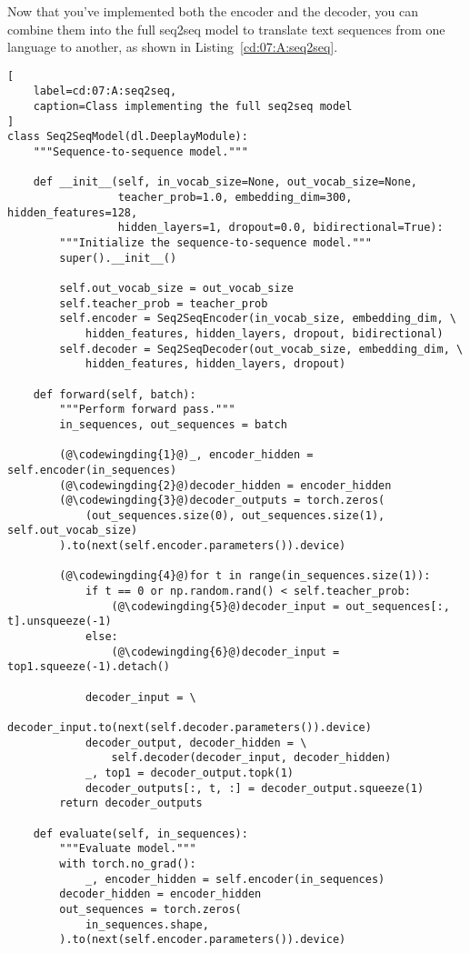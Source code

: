 Now that you've implemented both the encoder and the decoder, you can combine them into the full seq2seq model to translate text sequences from one language to another, as shown in Listing~\ref{cd:07:A:seq2seq}.
\begin{lstlisting}[
    label=cd:07:A:seq2seq,
    caption=Class implementing the full seq2seq model
]
class Seq2SeqModel(dl.DeeplayModule):
    """Sequence-to-sequence model."""

    def __init__(self, in_vocab_size=None, out_vocab_size=None,
                 teacher_prob=1.0, embedding_dim=300, hidden_features=128,
                 hidden_layers=1, dropout=0.0, bidirectional=True):
        """Initialize the sequence-to-sequence model."""
        super().__init__()
        
        self.out_vocab_size = out_vocab_size
        self.teacher_prob = teacher_prob
        self.encoder = Seq2SeqEncoder(in_vocab_size, embedding_dim, \
            hidden_features, hidden_layers, dropout, bidirectional)
        self.decoder = Seq2SeqDecoder(out_vocab_size, embedding_dim, \
            hidden_features, hidden_layers, dropout)

    def forward(self, batch):
        """Perform forward pass."""
        in_sequences, out_sequences = batch
        
        (@\codewingding{1}@)_, encoder_hidden = self.encoder(in_sequences)
        (@\codewingding{2}@)decoder_hidden = encoder_hidden
        (@\codewingding{3}@)decoder_outputs = torch.zeros(
            (out_sequences.size(0), out_sequences.size(1), self.out_vocab_size)
        ).to(next(self.encoder.parameters()).device)        

        (@\codewingding{4}@)for t in range(in_sequences.size(1)):
            if t == 0 or np.random.rand() < self.teacher_prob:
                (@\codewingding{5}@)decoder_input = out_sequences[:, t].unsqueeze(-1)
            else:
                (@\codewingding{6}@)decoder_input = top1.squeeze(-1).detach()

            decoder_input = \
                decoder_input.to(next(self.decoder.parameters()).device)
            decoder_output, decoder_hidden = \
                self.decoder(decoder_input, decoder_hidden)
            _, top1 = decoder_output.topk(1)
            decoder_outputs[:, t, :] = decoder_output.squeeze(1)
        return decoder_outputs

    def evaluate(self, in_sequences):
        """Evaluate model."""
        with torch.no_grad():
            _, encoder_hidden = self.encoder(in_sequences)
        decoder_hidden = encoder_hidden
        out_sequences = torch.zeros(
            in_sequences.shape,
        ).to(next(self.encoder.parameters()).device)
        

\end{lstlisting}
